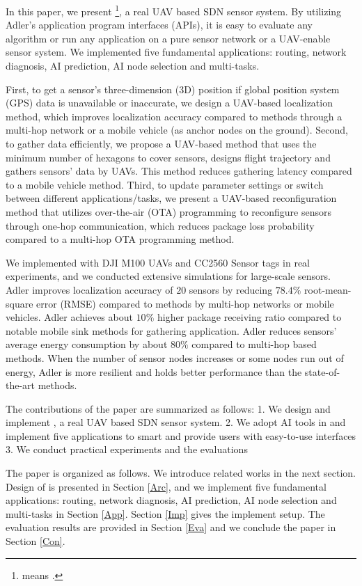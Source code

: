 In this paper, we present {\sdn}\footnote{{\sdn} means .}, a real UAV based SDN sensor system.
By utilizing Adler's application program interfaces (APIs), it is easy to evaluate any algorithm or run any application on a pure sensor network or a UAV-enable sensor system.
We implemented five fundamental applications: routing, network diagnosis, 
AI prediction, AI node selection and multi-tasks.

First, to get a sensor's three-dimension (3D) position if global position system (GPS) data is unavailable or inaccurate, we design a UAV-based localization method, which improves localization accuracy compared to methods through a multi-hop network or a mobile vehicle (as anchor nodes on the ground). Second, to gather data efficiently, we propose a UAV-based method that uses the minimum number of hexagons to cover sensors, designs flight trajectory and gathers sensors' data by UAVs. This method reduces gathering latency compared to a mobile vehicle method. Third, to update parameter settings or switch between different applications/tasks, we present a UAV-based reconfiguration method that utilizes over-the-air (OTA) programming to reconfigure sensors through one-hop communication, which reduces package loss probability compared to a multi-hop OTA programming method.

We implemented {\sdn} with DJI M100 UAVs and CC2560 Sensor tags in real experiments, and we conducted extensive simulations for large-scale sensors.
Adler improves localization accuracy of $20$ sensors by reducing $78.4\%$ root-mean-square error (RMSE) compared to methods by multi-hop networks or mobile vehicles. Adler achieves about $10\%$ higher package receiving ratio compared to notable mobile sink methods for gathering application. Adler reduces sensors' average energy consumption by about $80\%$ compared to multi-hop based methods. When the number of sensor nodes increases or some nodes run out of energy, Adler is more resilient and holds better performance than the state-of-the-art methods.


The contributions of the paper are summarized as follows:
1. We design and implement  {\sdn}, a real UAV based SDN sensor system.
2. We adopt AI tools in {\sdn} and implement five applications to smart and provide users with easy-to-use interfaces 
3. We conduct practical experiments and the evaluations 


The paper is organized as follows. We introduce related works in the next section. 
Design of {\sdn} is presented in Section \ref{Arc}, 
and we implement five fundamental applications: routing, network diagnosis, 
AI prediction, AI node selection and multi-tasks in Section \ref{App}. 
Section \ref{Imp} gives the implement setup.
The evaluation results are provided in Section \ref{Eva} 
and we conclude the paper in Section \ref{Con}.

